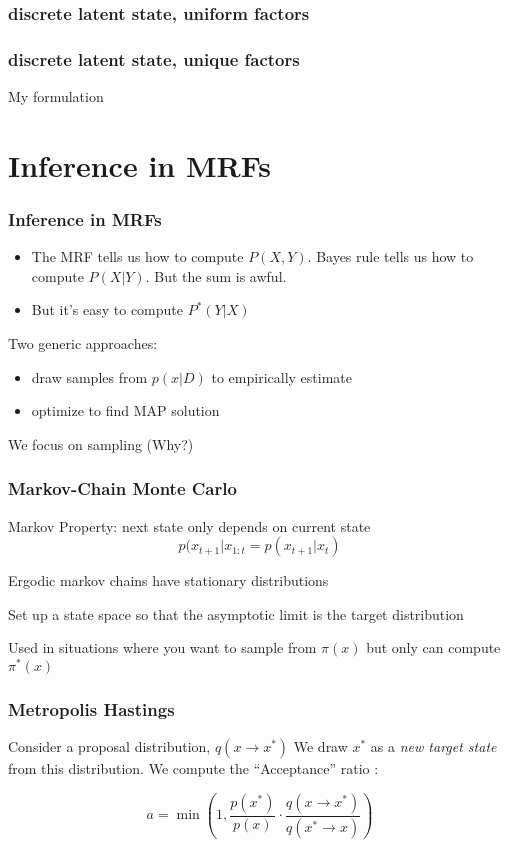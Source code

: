 \documentclass{beamer}
\begin{document}
\begin{frame}
  \frametitle{discrete latent state, uniform factors}
\end{frame}

\begin{frame}
\frametitle{discrete latent state, unique factors}
My formulation
\end{frame} 

\section{Inference in MRFs}

\begin{frame}
  \frametitle{Inference in MRFs}
  \begin{itemize}
  \item The MRF tells us how to compute $P(X, Y)$. Bayes rule
    tells us how to compute $P(X | Y)$. But the sum is awful. 
  \item But it's easy to compute $P^\ast(Y | X) $
  \end{itemize}
  Two generic approaches: 
  \begin{itemize}
  \item draw samples from $p(x | D)$ to empirically estimate 
  \item optimize to find MAP solution
  \end{itemize}
  \pause
  
  We focus on sampling (Why?) 
\end{frame}

\begin{frame}
  \frametitle{Markov-Chain Monte Carlo}
  Markov Property: next state only depends on current state
  \begin{equation*}
    p(x_{t+1} | x_{1:t} = p(x_{t+1} | x_{t})
  \end{equation*}

  Ergodic markov chains have stationary distributions
  
  Set up a state space so that the asymptotic limit is the target distribution

  Used in situations where you want to sample from
  $\pi(x)$ but only can compute $\pi^\ast(x)$

\end{frame}

\begin{frame}
  \frametitle{Metropolis Hastings}
  Consider a proposal distribution, $q(x \rightarrow x^\ast)$ 
  We draw $x^\ast$ as a \textit{new target state} from this distribution. 
  We compute the ``Acceptance'' ratio : 
  
  \begin{equation*}
    a = \min (1, \frac{p(x^\ast)}{p(x)} \cdot 
  \frac{q(x \rightarrow x^\ast)}{q(x^\ast \rightarrow x)})
  \end{equation*}

  \cite{Metropolis_Equation_1953}
\end{frame}
\end{document}
